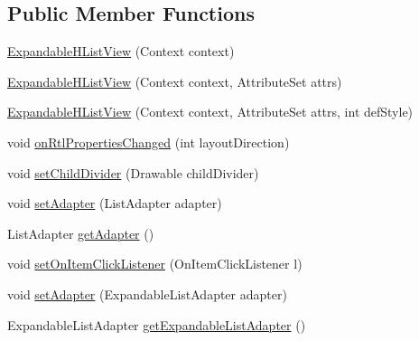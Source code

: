 \subsection*{Public Member Functions}
\begin{DoxyCompactItemize}
\item 
\hyperlink{classit_1_1sephiroth_1_1android_1_1library_1_1widget_1_1_expandable_h_list_view_a171f292383e1987f1f09635582677f49}{Expandable\+H\+List\+View} (Context context)
\item 
\hyperlink{classit_1_1sephiroth_1_1android_1_1library_1_1widget_1_1_expandable_h_list_view_ab1771942b7464da0b6db28d523726e76}{Expandable\+H\+List\+View} (Context context, Attribute\+Set attrs)
\item 
\hyperlink{classit_1_1sephiroth_1_1android_1_1library_1_1widget_1_1_expandable_h_list_view_adb92248c8800e1cd0f53d41d98da8da9}{Expandable\+H\+List\+View} (Context context, Attribute\+Set attrs, int def\+Style)
\item 
void \hyperlink{classit_1_1sephiroth_1_1android_1_1library_1_1widget_1_1_expandable_h_list_view_aaaf09ab1b75903e40e023effe2919ba6}{on\+Rtl\+Properties\+Changed} (int layout\+Direction)
\item 
void \hyperlink{classit_1_1sephiroth_1_1android_1_1library_1_1widget_1_1_expandable_h_list_view_a00b52ec2739b10d85b3fdcb397d4bd23}{set\+Child\+Divider} (Drawable child\+Divider)
\item 
void \hyperlink{classit_1_1sephiroth_1_1android_1_1library_1_1widget_1_1_expandable_h_list_view_a446df0b9b9d5e2530a81d26c18ccf782}{set\+Adapter} (List\+Adapter adapter)
\item 
List\+Adapter \hyperlink{classit_1_1sephiroth_1_1android_1_1library_1_1widget_1_1_expandable_h_list_view_af493a74c7e6c321450f767673d449849}{get\+Adapter} ()
\item 
void \hyperlink{classit_1_1sephiroth_1_1android_1_1library_1_1widget_1_1_expandable_h_list_view_a5910df07eab98d24d32ac238e3798f22}{set\+On\+Item\+Click\+Listener} (On\+Item\+Click\+Listener l)
\item 
void \hyperlink{classit_1_1sephiroth_1_1android_1_1library_1_1widget_1_1_expandable_h_list_view_af80efc6776a7025c50c9fbfdf43f9f85}{set\+Adapter} (Expandable\+List\+Adapter adapter)
\item 
Expandable\+List\+Adapter \hyperlink{classit_1_1sephiroth_1_1android_1_1library_1_1widget_1_1_expandable_h_list_view_aa4c2943afbebedb5279764ad2e3e89ee}{get\+Expandable\+List\+Adapter} ()
\item 

\end{DoxyCompactItemize}

